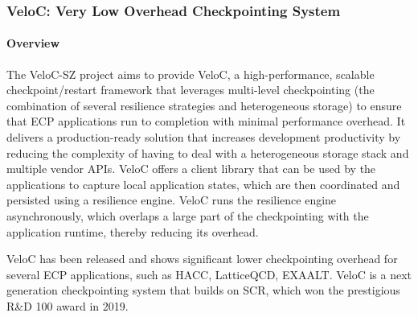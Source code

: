 \subsubsection{ VeloC: Very Low Overhead Checkpointing System} 

\paragraph{Overview} 

The VeloC-SZ project aims to provide VeloC, a high-performance, scalable
checkpoint/restart framework that leverages multi-level checkpointing
(the combination of several resilience strategies and heterogeneous
storage) to ensure that ECP applications run to completion with
minimal performance overhead. It delivers a production-ready solution
that increases development productivity by reducing the complexity of
having to deal with a heterogeneous storage stack and multiple vendor
APIs. VeloC offers a client library that can be used by the
applications to capture local application states, which are then
coordinated and persisted using a resilience engine.  VeloC runs the resilience engine asynchronously, which overlaps a large part of the checkpointing
with the application runtime, thereby reducing its overhead.

VeloC has been released and shows significant lower checkpointing
overhead for several ECP applications, such as HACC, LatticeQCD, 
EXAALT. VeloC is a next generation checkpointing system that builds on SCR, which won the prestigious R\&D 100 award in 2019. 

